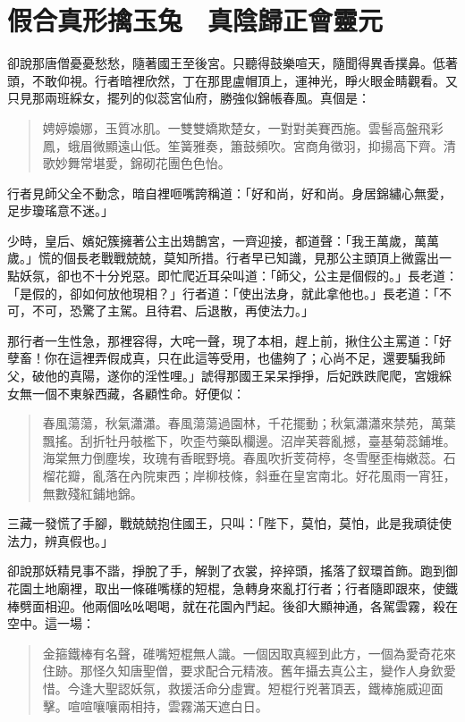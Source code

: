 
\chapter{假合真形擒玉兔　真陰歸正會靈元}

卻說那唐僧憂憂愁愁，隨著國王至後宮。只聽得鼓樂喧天，隨聞得異香撲鼻。低著頭，不敢仰視。行者暗裡欣然，丁在那毘盧帽頂上，運神光，睜火眼金睛觀看。又只見那兩班綵女，擺列的似蕊宮仙府，勝強似錦帳春風。真個是：
\begin{quote}
娉婷嬝娜，玉質冰肌。一雙雙嬌欺楚女，一對對美賽西施。雲髻高盤飛彩鳳，蛾眉微顯遠山低。笙簧雅奏，簫鼓頻吹。宮商角徵羽，抑揚高下齊。清歌妙舞常堪愛，錦砌花團色色怡。
\end{quote}

行者見師父全不動念，暗自裡咂嘴誇稱道：「好和尚，好和尚。身居錦繡心無愛，足步瓊瑤意不迷。」

少時，皇后、嬪妃簇擁著公主出鳷鵲宮，一齊迎接，都道聲：「我王萬歲，萬萬歲。」慌的個長老戰戰兢兢，莫知所措。行者早已知識，見那公主頭頂上微露出一點妖氛，卻也不十分兇惡。即忙爬近耳朵叫道：「師父，公主是個假的。」長老道：「是假的，卻如何放他現相？」行者道：「使出法身，就此拿他也。」長老道：「不可，不可，恐驚了主駕。且待君、后退散，再使法力。」

那行者一生性急，那裡容得，大咤一聲，現了本相，趕上前，揪住公主罵道：「好孽畜！你在這裡弄假成真，只在此這等受用，也儘夠了；心尚不足，還要騙我師父，破他的真陽，遂你的淫性哩。」諕得那國王呆呆掙掙，后妃跌跌爬爬，宮娥綵女無一個不東躲西藏，各顧性命。好便似：
\begin{quote}
春風蕩蕩，秋氣瀟瀟。春風蕩蕩過園林，千花擺動；秋氣瀟瀟來禁苑，萬葉飄搖。刮折牡丹攲檻下，吹歪芍藥臥欄邊。沼岸芙蓉亂撼，臺基菊蕊鋪堆。海棠無力倒塵埃，玫瑰有香眠野境。春風吹折芰荷楟，冬雪壓歪梅嫩蕊。石榴花瓣，亂落在內院東西；岸柳枝條，斜垂在皇宮南北。好花風雨一宵狂，無數殘紅鋪地錦。
\end{quote}

三藏一發慌了手腳，戰兢兢抱住國王，只叫：「陛下，莫怕，莫怕，此是我頑徒使法力，辨真假也。」

卻說那妖精見事不諧，掙脫了手，解剝了衣裳，捽捽頭，搖落了釵環首飾。跑到御花園土地廟裡，取出一條碓嘴樣的短棍，急轉身來亂打行者；行者隨即跟來，使鐵棒劈面相迎。他兩個吆吆喝喝，就在花園內鬥起。後卻大顯神通，各駕雲霧，殺在空中。這一場：
\begin{quote}
金箍鐵棒有名聲，碓嘴短棍無人識。一個因取真經到此方，一個為愛奇花來住跡。那怪久知唐聖僧，要求配合元精液。舊年攝去真公主，變作人身欽愛惜。今逢大聖認妖氛，救援活命分虛實。短棍行兇著頂丟，鐵棒施威迎面擊。喧喧嚷嚷兩相持，雲霧滿天遮白日。
\end{quote}

